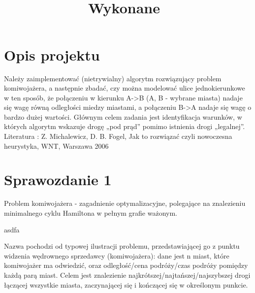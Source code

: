 \documentclass{article}
\title{
\vspace{2in}
\textmd{\textbf{\hmwkTitle}}\\
\normalsize\vspace{0.1in}\small{Wykonane\ \hmwkDueDate}\\
\vspace{0.1in}
\vspace{3in}
}
\author{\textbf{\hmwkAuthorName}}
\date{} %
\begin{document}
\maketitle



\newpage
\tableofcontents
\newpage


\section{Opis projektu}

Należy zaimplementować (nietrywialny) algorytm rozwiązujący problem komiwojażera, a następnie zbadać, czy można modelować ulice jednokierunkowe w ten sposób, że połączeniu w kierunku A->B (A, B - wybrane miasta) nadaje się wagę równą odległości miedzy miastami, a połączeniu B->A nadaje się wagę o bardzo dużej wartości. Głównym celem zadania jest identyfikacja warunków, w których algorytm wskazuje drogę „pod prąd” pomimo istnienia drogi „legalnej”. Literatura : Z. Michalewicz, D. B. Fogel, Jak to rozwiązać czyli nowoczesna heurystyka, WNT, Warszawa 2006
	
\section{Sprawozdanie 1}

Problem komiwojażera - zagadnienie optymalizacyjne, polegające na znalezieniu minimalnego cyklu Hamiltona w pełnym grafie ważonym.

asdfa

Nazwa pochodzi od typowej ilustracji problemu, przedstawiającej go z punktu widzenia wędrownego sprzedawcy (komiwojażera): dane jest n miast, które komiwojażer ma odwiedzić, oraz odległość/cena podróży/czas podróży pomiędzy każdą parą miast. Celem jest znalezienie najkrótszej/najtańszej/najszybszej drogi łączącej wszystkie miasta, zaczynającej się i kończącej się w określonym punkcie.
\\
\end{document}
